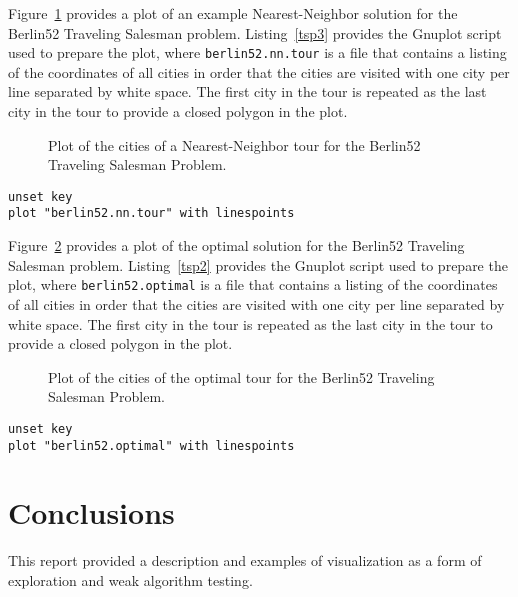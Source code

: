\documentclass[a4paper, 11pt]{article}
\begin{document}
Figure~\ref{plot:tsp3} provides a plot of an example Nearest-Neighbor solution for the Berlin52 Traveling Salesman problem. Listing~\ref{tsp3} provides the Gnuplot script used to prepare the plot, where \texttt{berlin52.nn.tour} is a file that contains a listing of the coordinates of all cities in order that the cities are visited with one city per line separated by white space. The first city in the tour is repeated as the last city in the tour to provide a closed polygon in the plot.

\begin{figure}[htp]

\caption{Plot of the cities of a Nearest-Neighbor tour for the Berlin52 Traveling Salesman Problem.}
\label{plot:tsp3}
\end{figure}

\begin{lstlisting}[caption=Gnuplot script for plotting a tour for a Traveling Salesman Problem., label=tsp3]
unset key
plot "berlin52.nn.tour" with linespoints
\end{lstlisting}

Figure~\ref{plot:tsp2} provides a plot of the optimal solution for the Berlin52 Traveling Salesman problem. Listing~\ref{tsp2} provides the Gnuplot script used to prepare the plot, where \texttt{berlin52.optimal} is a file that contains a listing of the coordinates of all cities in order that the cities are visited with one city per line separated by white space. The first city in the tour is repeated as the last city in the tour to provide a closed polygon in the plot.

\begin{figure}[htp]

\caption{Plot of the cities of the optimal tour for the Berlin52 Traveling Salesman Problem.}
\label{plot:tsp2}
\end{figure}

\begin{lstlisting}[caption=Gnuplot script for plotting a tour for a Traveling Salesman Problem., label=tsp2]
unset key
plot "berlin52.optimal" with linespoints
\end{lstlisting}

%
%
\section{Conclusions}
\label{sec:conclusions}
This report provided a description and examples of visualization as a form of exploration and weak algorithm testing. 



\end{document}
